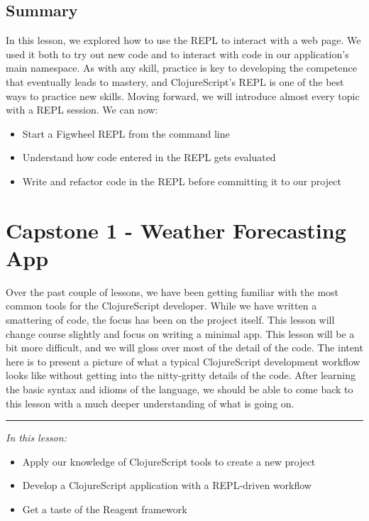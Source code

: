 \documentclass[10pt,twoside,openright]{memoir}
\begin{document}
\section{Summary}

In this lesson, we explored how to use the REPL to interact with a web
page. We used it both to try out new code and to interact with code in
our application's main namespace. As with any skill, practice is key to
developing the competence that eventually leads to mastery, and
ClojureScript's REPL is one of the best ways to practice new skills.
Moving forward, we will introduce almost every topic with a REPL
session. We can now:

\begin{itemize}
\tightlist
\item
  Start a Figwheel REPL from the command line
\item
  Understand how code entered in the REPL gets evaluated
\item
  Write and refactor code in the REPL before committing it to our
  project
\end{itemize}

\chapter{Capstone 1 - Weather Forecasting App}

Over the past couple of lessons, we have been getting familiar with the
most common tools for the ClojureScript developer. While we have written
a smattering of code, the focus has been on the project itself. This
lesson will change course slightly and focus on writing a minimal app.
This lesson will be a bit more difficult, and we will gloss over most of
the detail of the code. The intent here is to present a picture of what
a typical ClojureScript development workflow looks like without getting
into the nitty-gritty details of the code. After learning the basic
syntax and idioms of the language, we should be able to come back to
this lesson with a much deeper understanding of what is going on.

\begin{center}\rule{0.5\linewidth}{0.5pt}\end{center}

\emph{In this lesson:}

\begin{itemize}
\tightlist
\item
  Apply our knowledge of ClojureScript tools to create a new project
\item
  Develop a ClojureScript application with a REPL-driven workflow
\item
  Get a taste of the Reagent framework
\end{itemize}
\end{document}
